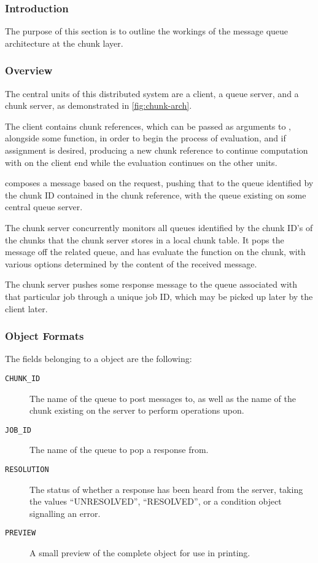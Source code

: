 \subsubsection{Introduction}

The purpose of this section is to outline the workings of the message queue architecture at the chunk layer.

\subsubsection{Overview}

The central units of this distributed system are a client, a queue server, and a chunk server, as demonstrated in \cref{fig:chunk-arch}.

The client contains chunk references, which can be passed as arguments to , alongside some function, in order to begin the process of evaluation, and if assignment is desired, producing a new chunk reference to continue computation with on the client end while the evaluation continues on the other units.

 composes a message based on the request, pushing that
to the queue identified by the chunk ID contained in the chunk reference, with
the queue existing on some central queue server.

The chunk server concurrently monitors all queues identified by the chunk ID's of the chunks that the chunk server stores in a local chunk table.
It pops the message off the related queue, and has  evaluate the function on the chunk, with various options determined by the content of the received message.

The chunk server pushes some response message to the queue associated with that particular job through a unique job ID, which may be picked up later by the client later.


\subsubsection{Object Formats}
The fields belonging to a  object are the following: \begin{description} \item[\texttt{CHUNK\_ID}] The name of the queue to post messages to, as well as the name of the chunk existing on the server to perform operations upon.
	\item[\texttt{JOB\_ID}] The name of the queue to pop a response from.
	\item[\texttt{RESOLUTION}] The status of whether a response has been
		heard from the server, taking the values ``UNRESOLVED'',
		``RESOLVED'', or a condition object signalling an error.
	\item[\texttt{PREVIEW}] A small preview of the complete object for use
		in printing.
\end{description}

